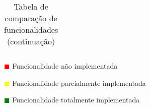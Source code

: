 \begin{table}[!ht]
\begin{center}
\begin{tabular}{|p{4cm}|p{0.1cm}|p{0.1cm}|p{0.1cm}|p{0.1cm}|}
		\end{tabular}
	\end{center}
	\hspace{1.2cm}	\textcolor{red}{$\blacksquare$} Funcionalidade não implementada
	
	\hspace{1.2cm}     \textcolor{yellow}{$\blacksquare$} Funcionalidade parcialmente implementada
	
	\hspace{1.2cm}     \textcolor{green}{$\blacksquare$} Funcionalidade totalmente implementada 
	\begin{center}
		\caption{Tabela de comparação de funcionalidades (continuação)}
		\label{tab:comparacao2}
	\end{center}
\end{table}




\pagebreak
\blankpage

\glsresetall




